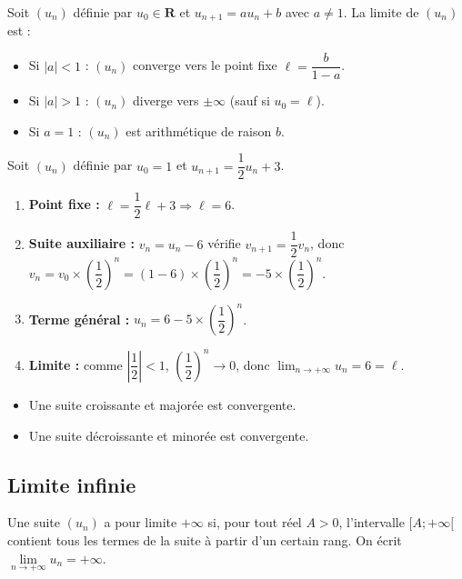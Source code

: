 \documentclass[11pt,a4paper,openany]{book}
\theoremstyle{definition}
\begin{document}
    \begin{Propriété}
    Soit $(u_n)$ définie par $u_0\in\mathbf{R}$ et $u_{n+1}=au_n+b$
    avec $a\neq 1$. La limite de $(u_n)$ est :
    \begin{itemize}
        \item Si $|a|<1$ : $(u_n)$ converge vers le point fixe
              $\ell=\dfrac{b}{1-a}$.
        \item Si $|a|>1$ : $(u_n)$ diverge vers $\pm\infty$
              (sauf si $u_0=\ell$).
        \item Si $a=1$ : $(u_n)$ est arithmétique de raison $b$.
    \end{itemize}
    \end{Propriété}

    \begin{Exemple}
    Soit $(u_n)$ définie par $u_0=1$ et $u_{n+1}=\dfrac{1}{2}u_n+3$.
    \begin{enumerate}
        \item \textbf{Point fixe :} $\ell=\dfrac{1}{2}\ell+3
              \Rightarrow \ell=6$.
        \item \textbf{Suite auxiliaire :} $v_n=u_n-6$ vérifie
              $v_{n+1}=\dfrac{1}{2}v_n$, donc $v_n=v_0\times\!\left(\dfrac{1}{2}\right)^n
              =(1-6)\times\!\left(\dfrac{1}{2}\right)^n
              =-5\times\!\left(\dfrac{1}{2}\right)^n$.
        \item \textbf{Terme général :}
              $u_n=6-5\times\!\left(\dfrac{1}{2}\right)^n$.
        \item \textbf{Limite :} comme $\left|\dfrac{1}{2}\right|<1$,
              $\left(\dfrac{1}{2}\right)^n\to 0$, donc
              $\displaystyle\lim_{n\to+\infty}u_n=6=\ell$.
    \end{enumerate}
    \end{Exemple}

    \begin{Théorème}
    \begin{itemize}
        \item Une suite croissante et majorée est convergente.
        \item Une suite décroissante et minorée est convergente.
    \end{itemize}
    \end{Théorème}

    \subsection{Limite infinie}
    \begin{Définition}
    Une suite $(u_n)$ a pour limite $+\infty$ si, pour tout réel $A>0$, l'intervalle
    $[A;+\infty[$ contient tous les termes de la suite à partir d'un certain rang.
    On écrit $\lim\limits_{n\to+\infty}u_n=+\infty$.
    \end{Définition}
\end{document}

